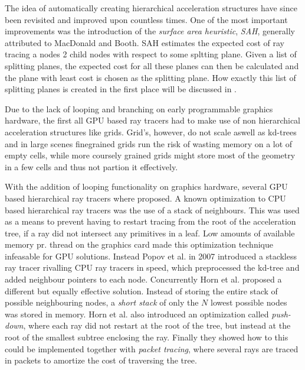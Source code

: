 
The idea of automatically creating hierarchical acceleration
structures have since been revisited and improved upon countless
times. One of the most important improvements was the introduction of
the \textit{surface area heuristic}, \textit{SAH}, generally
attributed to MacDonald and Booth. SAH
estimates the expected cost of ray tracing a nodes 2 child nodes with
respect to some spltting plane. Given a list of splitting planes, the
expected cost for all these planes can then be calculated and the
plane with least cost is chosen as the splitting plane. How exactly
this list of splitting planes is created in the first place will be
discussed in .



Due to the lack of looping and branching on early programmable
graphics hardware, the first all GPU based ray tracers had to make use
of non hierarchical acceleration structures like
grids. Grid's, however, do not scale aswell as
kd-trees and in large scenes finegrained grids run the risk of wasting
memory on a lot of empty cells, while more coursely grained grids
might store most of the geometry in a few cells and thus not partion
it effectively.


With the addition of looping functionality on graphics hardware,
several GPU based hierarchical ray tracers where proposed. A known
optimization to CPU based hierarchical ray tracers was the use of a
stack of neighbours. This was used as a means to prevent having to
restart tracing from the root of the acceleration tree, if a ray did
not intersect any primitives in a leaf. Low amounts of available
memory pr. thread on the graphics card made this optimization
technique infeasable for GPU solutions. Instead Popov et
al. in 2007 introduced a stackless ray tracer
rivalling CPU ray tracers in speed, which preprocessed the kd-tree and
added neighbour pointers to each node. Concurrently Horn et
al. proposed a different but equally effective
solution. Instead of storing the entire stack of possible neighbouring
nodes, a \textit{short stack} of only the $N$ lowest possible nodes
was stored in memory. Horn et al. also introduced an optimization
called \textit{push-down}, where each ray did not restart at the root
of the tree, but instead at the root of the smallest subtree enclosing
the ray. Finally they showed how to this could be implemented together
with \textit{packet tracing}, where several rays are traced in packets
to amortize the cost of traversing the tree.

